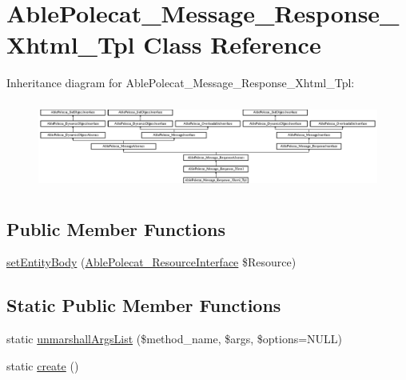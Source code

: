 \hypertarget{class_able_polecat___message___response___xhtml___tpl}{}\section{Able\+Polecat\+\_\+\+Message\+\_\+\+Response\+\_\+\+Xhtml\+\_\+\+Tpl Class Reference}
\label{class_able_polecat___message___response___xhtml___tpl}
Inheritance diagram for Able\+Polecat\+\_\+\+Message\+\_\+\+Response\+\_\+\+Xhtml\+\_\+\+Tpl\+:\begin{figure}[H]
\begin{center}
\leavevmode
\includegraphics[height=2.903704cm]{class_able_polecat___message___response___xhtml___tpl}
\end{center}
\end{figure}
\subsection*{Public Member Functions}
\begin{DoxyCompactItemize}
\item 
\hyperlink{class_able_polecat___message___response___xhtml___tpl_a858ab2a95af7d312509c203de5c6fb11}{set\+Entity\+Body} (\hyperlink{interface_able_polecat___resource_interface}{Able\+Polecat\+\_\+\+Resource\+Interface} \$Resource)
\end{DoxyCompactItemize}
\subsection*{Static Public Member Functions}
\begin{DoxyCompactItemize}
\item 
static \hyperlink{class_able_polecat___message___response___xhtml___tpl_a94d2e558bba777f54dcc10f1bfc4dca5}{unmarshall\+Args\+List} (\$method\+\_\+name, \$args, \$options=N\+U\+L\+L)
\item 
static \hyperlink{class_able_polecat___message___response___xhtml___tpl_a239b1c70258014a86569483c2d009de6}{create} ()
\end{DoxyCompactItemize}
